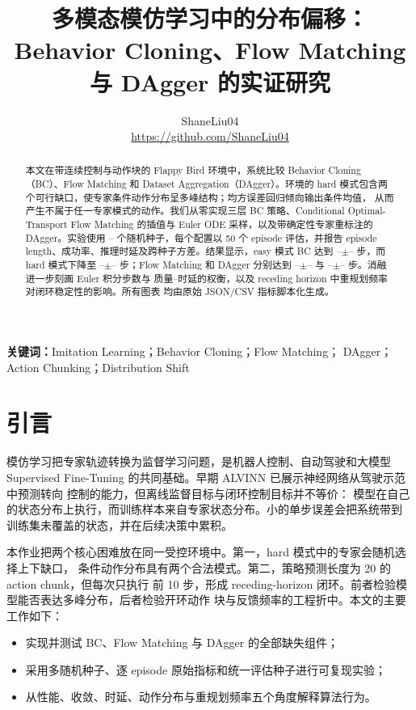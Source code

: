 \documentclass[10pt,twocolumn,a4paper]{ctexart}
\title{\vspace{-1.2em}\textbf{多模态模仿学习中的分布偏移：\\
Behavior Cloning、Flow Matching 与 DAgger 的实证研究}}
\author{ShaneLiu04\\
\small\url{https://github.com/ShaneLiu04}}
\date{}
\providecommand{\BCEasyMean}{--}
\providecommand{\BCEasyStd}{--}
\providecommand{\BCHardMean}{--}
\providecommand{\BCHardStd}{--}
\providecommand{\FlowHardMean}{--}
\providecommand{\FlowHardStd}{--}
\providecommand{\DaggerHardMean}{--}
\providecommand{\DaggerHardStd}{--}
\providecommand{\NumSeeds}{--}
\begin{document}
\maketitle
\thispagestyle{fancy}

\begin{abstract}
本文在带连续控制与动作块的 Flappy Bird 环境中，系统比较 Behavior
Cloning（BC）、Flow Matching 和 Dataset Aggregation（DAgger）。环境的 hard
模式包含两个可行缺口，使专家条件动作分布呈多峰结构；均方误差回归倾向输出条件均值，
从而产生不属于任一专家模式的动作。我们从零实现三层 BC 策略、Conditional
Optimal-Transport Flow Matching 的插值与 Euler ODE 采样，以及带确定性专家重标注的
DAgger。实验使用 \NumSeeds{} 个随机种子，每个配置以 50 个 episode 评估，并报告
episode length、成功率、推理时延及跨种子方差。结果显示，easy 模式 BC 达到
\BCEasyMean$\pm$\BCEasyStd{} 步，而 hard 模式下降至
\BCHardMean$\pm$\BCHardStd{} 步；Flow Matching 和 DAgger 分别达到
\FlowHardMean$\pm$\FlowHardStd{} 与
\DaggerHardMean$\pm$\DaggerHardStd{} 步。消融进一步刻画 Euler 积分步数与
质量--时延的权衡，以及 receding horizon 中重规划频率对闭环稳定性的影响。所有图表
均由原始 JSON/CSV 指标脚本化生成。
\end{abstract}

\textbf{关键词：}Imitation Learning；Behavior Cloning；Flow Matching；
DAgger；Action Chunking；Distribution Shift

\section{引言}
模仿学习把专家轨迹转换为监督学习问题，是机器人控制、自动驾驶和大模型
Supervised Fine-Tuning 的共同基础。早期 ALVINN 已展示神经网络从驾驶示范中预测转向
控制的能力\citep{pomerleau1989alvinn}，但离线监督目标与闭环控制目标并不等价：
模型在自己的状态分布上执行，而训练样本来自专家状态分布。小的单步误差会把系统带到
训练集未覆盖的状态，并在后续决策中累积\citep{ross2010efficient,ross2011dagger}。

本作业把两个核心困难放在同一受控环境中。第一，hard 模式中的专家会随机选择上下缺口，
条件动作分布具有两个合法模式。第二，策略预测长度为 20 的 action chunk，但每次只执行
前 10 步，形成 receding-horizon 闭环。前者检验模型能否表达多峰分布，后者检验开环动作
块与反馈频率的工程折中。本文的主要工作如下：
\begin{itemize}
  \item 实现并测试 BC、Flow Matching 与 DAgger 的全部缺失组件；
  \item 采用多随机种子、逐 episode 原始指标和统一评估种子进行可复现实验；
  \item 从性能、收敛、时延、动作分布与重规划频率五个角度解释算法行为。
\end{itemize}
\end{document}
